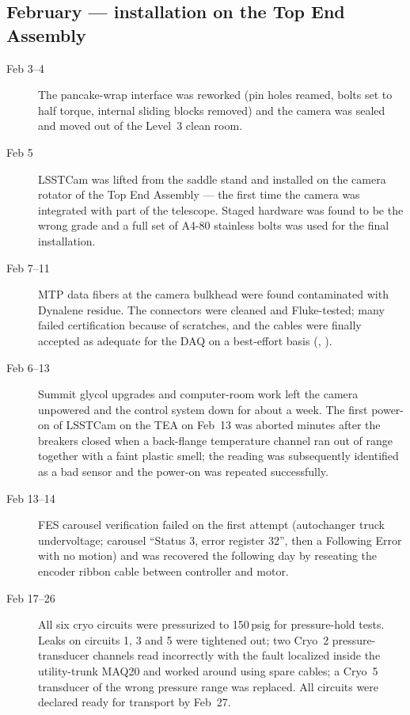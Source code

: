 \subsection{February --- installation on the Top End Assembly}
\begin{description}
\item[Feb 3--4] The pancake-wrap interface was reworked (pin holes
  reamed, bolts set to half torque, internal sliding blocks removed)
  and the camera was sealed and moved out of the Level~3 clean room.

\item[Feb 5] LSSTCam was lifted from the saddle stand and installed on
  the camera rotator of the Top End Assembly --- the first time the
  camera was integrated with part of the telescope.  Staged hardware
  was found to be the wrong grade and a full set of A4-80 stainless
  bolts was used for the final installation.

\item[Feb 7--11] MTP data fibers at the camera bulkhead were found
  contaminated with Dynalene residue.  The connectors were cleaned and
  Fluke-tested; many failed certification because of scratches, and
  the cables were finally accepted as adequate for the DAQ on a
  best-effort basis (, ).

\item[Feb 6--13] Summit glycol upgrades and computer-room work left
  the camera unpowered and the control system down for about a week.
  The first power-on of LSSTCam on the TEA on Feb~13 was aborted
  minutes after the breakers closed when a back-flange temperature
  channel ran out of range together with a faint plastic smell; the
  reading was subsequently identified as a bad sensor and the power-on
  was repeated successfully.

\item[Feb 13--14] FES carousel verification failed on the first
  attempt (autochanger truck undervoltage; carousel ``Status 3, error
  register 32'', then a Following Error with no motion) and was
  recovered the following day by reseating the encoder ribbon cable
  between controller and motor.

\item[Feb 17--26] All six cryo circuits were pressurized to 150\,psig
  for pressure-hold tests.  Leaks on circuits 1, 3 and 5 were
  tightened out; two Cryo~2 pressure-transducer channels read
  incorrectly with the fault localized inside the utility-trunk MAQ20
  and worked around using spare cables; a Cryo~5 transducer of the
  wrong pressure range was replaced.  All circuits were declared
  ready for transport by Feb~27.


\end{description}
